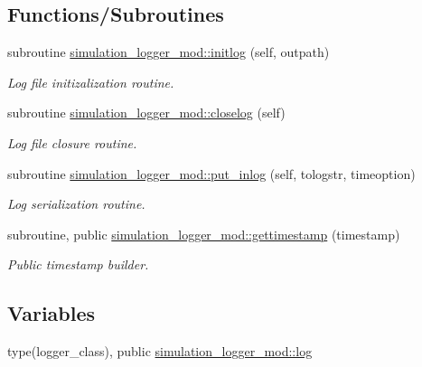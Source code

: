 \subsection*{Functions/\+Subroutines}
\begin{DoxyCompactItemize}
\item 
subroutine \mbox{\hyperlink{namespacesimulation__logger__mod_abf603e657da9104a8060ab53c72f0aca}{simulation\+\_\+logger\+\_\+mod\+::initlog}} (self, outpath)
\begin{DoxyCompactList}\small\item\em Log file initizalization routine. \end{DoxyCompactList}\item 
subroutine \mbox{\hyperlink{namespacesimulation__logger__mod_aa6d1aaea74403186da0f98afb74ecebe}{simulation\+\_\+logger\+\_\+mod\+::closelog}} (self)
\begin{DoxyCompactList}\small\item\em Log file closure routine. \end{DoxyCompactList}\item 
subroutine \mbox{\hyperlink{namespacesimulation__logger__mod_a34980631cfcf2d2172aa3b491acace4c}{simulation\+\_\+logger\+\_\+mod\+::put\+\_\+inlog}} (self, tologstr, timeoption)
\begin{DoxyCompactList}\small\item\em Log serialization routine. \end{DoxyCompactList}\item 
subroutine, public \mbox{\hyperlink{namespacesimulation__logger__mod_a0326a5eeb649b041064a01d96aef0989}{simulation\+\_\+logger\+\_\+mod\+::gettimestamp}} (timestamp)
\begin{DoxyCompactList}\small\item\em Public timestamp builder. \end{DoxyCompactList}\end{DoxyCompactItemize}
\subsection*{Variables}
\begin{DoxyCompactItemize}
\item 
type(logger\+\_\+class), public \mbox{\hyperlink{namespacesimulation__logger__mod_aa778de9905350741e1f40bb04fdc1cf6}{simulation\+\_\+logger\+\_\+mod\+::log}}
\end{DoxyCompactItemize}
